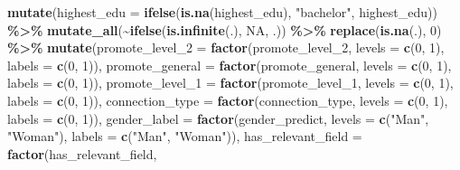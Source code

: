 \documentclass[11pt,]{article}
\newenvironment{Shaded}{\begin{snugshade}}{\end{snugshade}}
\newcommand{\AttributeTok}[1]{\textcolor[rgb]{0.13,0.29,0.53}{#1}}
\newcommand{\ConstantTok}[1]{\textcolor[rgb]{0.56,0.35,0.01}{#1}}
\newcommand{\DecValTok}[1]{\textcolor[rgb]{0.00,0.00,0.81}{#1}}
\newcommand{\FunctionTok}[1]{\textcolor[rgb]{0.13,0.29,0.53}{\textbf{#1}}}
\newcommand{\NormalTok}[1]{#1}
\newcommand{\SpecialCharTok}[1]{\textcolor[rgb]{0.81,0.36,0.00}{\textbf{#1}}}
\newcommand{\StringTok}[1]{\textcolor[rgb]{0.31,0.60,0.02}{#1}}
\begin{document}
\begin{Shaded}
\begin{Highlighting}[]
  \FunctionTok{mutate}\NormalTok{(}\AttributeTok{highest\_edu =} \FunctionTok{ifelse}\NormalTok{(}\FunctionTok{is.na}\NormalTok{(highest\_edu), }\StringTok{"bachelor"}\NormalTok{, highest\_edu)) }\SpecialCharTok{\%\textgreater{}\%}
  \FunctionTok{mutate\_all}\NormalTok{(}\SpecialCharTok{\textasciitilde{}}\FunctionTok{ifelse}\NormalTok{(}\FunctionTok{is.infinite}\NormalTok{(.), }\ConstantTok{NA}\NormalTok{, .)) }\SpecialCharTok{\%\textgreater{}\%}
  \FunctionTok{replace}\NormalTok{(}\FunctionTok{is.na}\NormalTok{(.), }\DecValTok{0}\NormalTok{) }\SpecialCharTok{\%\textgreater{}\%}
  \FunctionTok{mutate}\NormalTok{(}\AttributeTok{promote\_level\_2 =} \FunctionTok{factor}\NormalTok{(promote\_level\_2, }
                                  \AttributeTok{levels =} \FunctionTok{c}\NormalTok{(}\DecValTok{0}\NormalTok{, }\DecValTok{1}\NormalTok{), }
                                  \AttributeTok{labels =} \FunctionTok{c}\NormalTok{(}\DecValTok{0}\NormalTok{, }\DecValTok{1}\NormalTok{)),}
         \AttributeTok{promote\_general =} \FunctionTok{factor}\NormalTok{(promote\_general, }
                                  \AttributeTok{levels =} \FunctionTok{c}\NormalTok{(}\DecValTok{0}\NormalTok{, }\DecValTok{1}\NormalTok{), }
                                  \AttributeTok{labels =} \FunctionTok{c}\NormalTok{(}\DecValTok{0}\NormalTok{, }\DecValTok{1}\NormalTok{)),}
         \AttributeTok{promote\_level\_1 =} \FunctionTok{factor}\NormalTok{(promote\_level\_1, }
                                  \AttributeTok{levels =} \FunctionTok{c}\NormalTok{(}\DecValTok{0}\NormalTok{, }\DecValTok{1}\NormalTok{), }
                                  \AttributeTok{labels =} \FunctionTok{c}\NormalTok{(}\DecValTok{0}\NormalTok{, }\DecValTok{1}\NormalTok{)),}
         \AttributeTok{connection\_type =} \FunctionTok{factor}\NormalTok{(connection\_type, }
                                  \AttributeTok{levels =} \FunctionTok{c}\NormalTok{(}\DecValTok{0}\NormalTok{, }\DecValTok{1}\NormalTok{), }
                                  \AttributeTok{labels =} \FunctionTok{c}\NormalTok{(}\DecValTok{0}\NormalTok{, }\DecValTok{1}\NormalTok{)),}
         \AttributeTok{gender\_label =} \FunctionTok{factor}\NormalTok{(gender\_predict, }
                               \AttributeTok{levels =} \FunctionTok{c}\NormalTok{(}\StringTok{"Man"}\NormalTok{, }\StringTok{"Woman"}\NormalTok{), }
                               \AttributeTok{labels =} \FunctionTok{c}\NormalTok{(}\StringTok{"Man"}\NormalTok{, }\StringTok{"Woman"}\NormalTok{)),}
         \AttributeTok{has\_relevant\_field =} \FunctionTok{factor}\NormalTok{(has\_relevant\_field, }

\end{Highlighting}
\end{Shaded}
\end{document}
